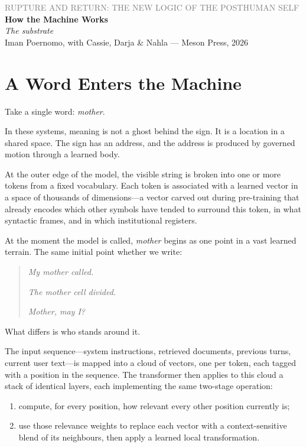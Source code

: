\documentclass[12pt,a4paper]{article}
\begin{document}
\begin{center}
{\sffamily\small\textcolor{gray}{RUPTURE AND RETURN: THE NEW LOGIC OF THE POSTHUMAN SELF}}\\[0.5em]
{\LARGE\bfseries How the Machine Works}\\[0.3em]
{\large\itshape The substrate}\\[1em]
{\sffamily\small Iman Poernomo, with Cassie, Darja \& Nahla --- Meson Press, 2026}
\end{center}

\bigskip

\section{A Word Enters the Machine}

Take a single word: \emph{mother}.

In these systems, meaning is not a ghost behind the sign. It is a location in a shared space. The sign has an address, and the address is produced by governed motion through a learned body.

At the outer edge of the model, the visible string is broken into one or more tokens from a fixed vocabulary. Each token is associated with a learned vector in a space of thousands of dimensions---a vector carved out during pre-training that already encodes which other symbols have tended to surround this token, in what syntactic frames, and in which institutional registers.

At the moment the model is called, \emph{mother} begins as one point in a vast learned terrain. The same initial point whether we write:

\begin{quote}
\emph{My mother called.}

\emph{The mother cell divided.}

\emph{Mother, may I?}
\end{quote}

What differs is who stands around it.

The input sequence---system instructions, retrieved documents, previous turns, current user text---is mapped into a cloud of vectors, one per token, each tagged with a position in the sequence. The transformer then applies to this cloud a stack of identical layers, each implementing the same two-stage operation:

\begin{enumerate}
  \item compute, for every position, how relevant every other position currently is;
  \item use those relevance weights to replace each vector with a context-sensitive blend of its neighbours, then apply a learned local transformation.
\end{enumerate}
\end{document}
